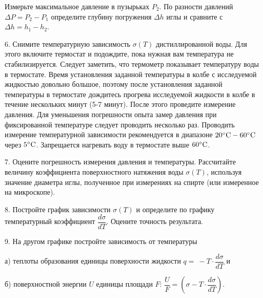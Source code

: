 \documentclass[a4paper,12pt]{article} %
\theoremstyle{plain} %
\theoremstyle{definition} %
\theoremstyle{remark} %
\begin{document}
Измерьте максимальное давление в пузырьках $P_2$. По разности давлений $\Delta P = P_2 - P_1$ определите глубину погружения $\Delta h$ иглы и сравните с $\Delta h =  h_1- h_2.$ 

6. Снимите температурную зависимость $\sigma(T)$ дистиллированной воды. Для этого включите термостат и подождите, пока нужная вам температура не стабилизируется. Следует заметить, что термометр показывает температуру воды в термостате. Время установления заданной температуры в колбе с исследуемой жидкостью довольно большое, поэтому после установления заданной температуры в термостате дождитесь прогрева исследуемой жидкости в колбе в течение нескольких минут (5-7 минут). После этого проведите измерение давления. Для уменьшения погрешности опыта замер давления  при фиксированной температуре следует проводить несколько раз. 
Проводить измерение температурной зависимости  рекомендуется в диапазоне  $\rm 20^{\circ}C - 60^{\circ}C$ через $\rm 5^{\circ}C$. Запрещается нагревать воду в термостате выше $\rm 60^{\circ}C$.

7. Оцените погрешность измерения давления и температуры. Рассчитайте величину коэффициента поверхностного натяжения воды $\sigma (T)$, используя значение диаметра иглы, полученное при измерениях на спирте (или измеренное на микроскопе).

8. Постройте график зависимости $\sigma (T)$ и определите по графику температурный коэффициент  $\dfrac{d\sigma}{dT}$. Оцените точность результата.

9. На другом графике постройте зависимость от температуры

а) теплоты образования единицы поверхности жидкости $q=\ -T\cdot \dfrac{d\sigma}{dT}$   и 

б) поверхностной энергии $U$ единицы площади $F$:  $\dfrac{U}{F} = (\sigma -T\cdot \dfrac{d\sigma}{dT} ).$ 
\end{document}
